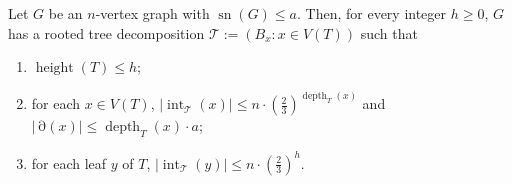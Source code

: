 \documentclass{patmorin}
\newcommand{\pat}[1]{\textcolor{Blue}{[Pat: #1]}}
\DeclareMathOperator{\sep}{sn}
\DeclareMathOperator{\depth}{depth}
\DeclareMathOperator{\height}{height}
\DeclareMathOperator{\interior}{int}
\DeclareMathOperator{\boundary}{\partial}
\newcommand{\hussein}[1]{\textcolor{purple}{HH: #1}}
\begin{document}
\begin{lem}\label{separation_tree}
  Let $G$ be an $n$-vertex graph with $\sep(G)\le a$.  Then, for every integer $h\ge 0$, $G$ has a rooted tree decomposition $\mathcal{T}:=(B_x:x\in V(T))$ such that
  \begin{enumerate}[nosep,nolistsep,label=(\roman*)]
    \item\label{height_bound} $\height(T)\le h$;
    \item\label{size_bounds} for each $x\in V(T)$,  $|\interior_\mathcal{T}(x)|\le n\cdot(\tfrac{2}{3})^{\depth_T(x)}$ and $|\boundary(x)|\le \depth_T(x)\cdot a$;
    \item\label{leaf_size_bounds} for each leaf $y$ of $T$, $|\interior_{\mathcal{T}}(y)|\le n\cdot(\tfrac{2}{3})^h$.
  \end{enumerate}
\end{lem}

  
\end{document}
